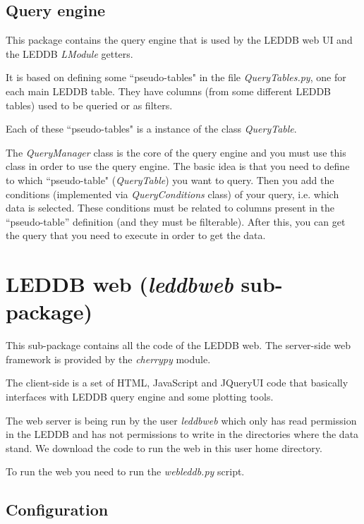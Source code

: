 \documentclass[a4paper,11pt]{article}
\begin{document}
\subsection{Query engine}
\label{sec:query}

This package contains the query engine that is used by the LEDDB web UI and the LEDDB \textit{LModule} getters.

It is based on defining some ``pseudo-tables" in the file \textit{QueryTables.py}, one for each main LEDDB table. They have columns (from some different LEDDB tables) used to be queried or as filters.

Each of these ``pseudo-tables" is a instance of the class \textit{QueryTable}.

The \textit{QueryManager} class is the core of the query engine and you must use this class in order to use the query engine. The basic idea is that you need to define to which ``pseudo-table" (\textit{QueryTable}) you want to query. Then you add the conditions (implemented via \textit{QueryConditions} class) of your query, i.e. which data is selected. These conditions must be related to columns present in the ``pseudo-table'' definition (and they must be filterable). After this, you can get the query that you need to execute in order to get the data.

\section{LEDDB web (\textit{leddbweb} sub-package)}
\label{sec:web}

This sub-package contains all the code of the LEDDB web. The server-side web framework is provided by the \textit{cherrypy} module.

The client-side is a set of HTML, JavaScript and JQueryUI code that basically interfaces with LEDDB query engine and some plotting tools.

The web server is being run by the user \textit{leddbweb} which only has read permission in the LEDDB and has not permissions to write in the directories where the data stand. We download the code to run the web in this user home directory.

To run the web you need to run the \textit{webleddb.py} script.

\subsection{Configuration}
\label{sec:webconfig}
\end{document}
